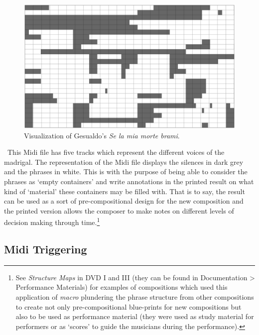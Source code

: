 \begin{figure}[htbp] %
   \centering
   \includegraphics[width=16cm]{chapter5/midi_gesualdo.tif} %
   \caption{Visualization of Gesualdo's \emph{Se la mia morte brami}.}
   \label{fig:example}
\end{figure}\
This Midi file has five tracks which represent the different voices of the madrigal. The representation of the Midi file displays the silences in dark grey and the phrases in white. This is with the purpose of being able to consider the phrases as `empty containers' and write annotations in the printed result on what kind of `material' these containers may be filled with. That is to say, the result can be used as a sort of pre-compositional design for the new composition and the printed version allows the composer to make notes on different levels of decision making through time.\footnote{See \emph{Structure Maps} in DVD I and III (they can be found in Documentation \tiny \textgreater \footnotesize \hspace{0pt} Performance Materials) for examples of compositions which used this application of \emph{macro} plundering the phrase structure from other compositions to create not only pre-compositional blue-prints for new compositions but also to be used as performance material (they were used as study material for performers or as `scores' to guide the musicians during the performance).}

\subsection{Midi Triggering}

